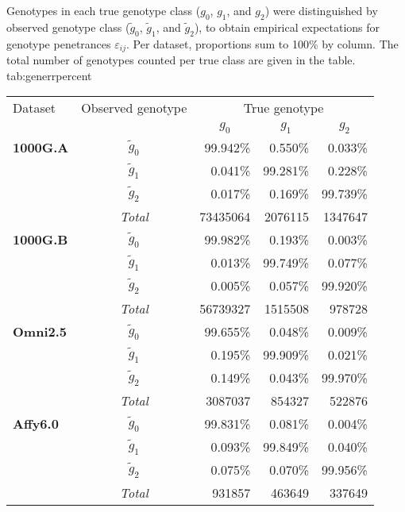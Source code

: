 

\begin{table}[!htb]
{Genotypes in each true genotype class ($g_0$, $g_1$, and $g_2$) were distinguished by observed genotype class ($\tilde{g}_0$, $\tilde{g}_1$, and $\tilde{g}_2$), to obtain empirical expectations for genotype penetrances $\varepsilon_{ij}$.
Per dataset, proportions sum to 100\% by column.
The total number of genotypes counted per true class are given in the table.}
{tab:generrpercent}
\centering
\begin{threeparttable}
\renewcommand{\arraystretch}{1.1}%
\begin{tabular}{lcrrr}
\toprule
 Dataset & Observed genotype & \multicolumn{3}{c}{True genotype} \\ \cmidrule(lr){3-5}
 & & \multicolumn{1}{c}{$g_0$} & \multicolumn{1}{c}{$g_1$} & \multicolumn{1}{c}{$g_2$} \\ \midrule
\textbf{1000G.A}
& $\tilde{g}_0$ & 99.942\% &  0.550\% &  0.033\% \\
& $\tilde{g}_1$ &  0.041\% & 99.281\% &  0.228\% \\
& $\tilde{g}_2$ &  0.017\% &  0.169\% & 99.739\% \\ \cmidrule(lr){2-5}
& \emph{Total} & \num{73435064} & \num{2076115} & \num{1347647} \\ \midrule
\textbf{1000G.B}
& $\tilde{g}_0$ & 99.982\% &  0.193\% &  0.003\% \\
& $\tilde{g}_1$ &  0.013\% & 99.749\% &  0.077\% \\
& $\tilde{g}_2$ &  0.005\% &  0.057\% & 99.920\% \\ \cmidrule(lr){2-5}
& \emph{Total} & \num{56739327} & \num{1515508} & \num{978728} \\ \midrule
\textbf{Omni2.5}
& $\tilde{g}_0$ & 99.655\% &  0.048\% &  0.009\% \\
& $\tilde{g}_1$ &  0.195\% & 99.909\% &  0.021\% \\
& $\tilde{g}_2$ &  0.149\% &  0.043\% & 99.970\% \\ \cmidrule(lr){2-5}
& \emph{Total} & \num{3087037} & \num{854327} & \num{522876} \\ \midrule
\textbf{Affy6.0}
& $\tilde{g}_0$ & 99.831\% &  0.081\% &  0.004\% \\
& $\tilde{g}_1$ &  0.093\% & 99.849\% &  0.040\% \\
& $\tilde{g}_2$ &  0.075\% &  0.070\% & 99.956\% \\ \cmidrule(lr){2-5}
& \emph{Total} &  \num{931857} & \num{463649} & \num{337649} \\ \bottomrule
\end{tabular}



\end{threeparttable}
\end{table}
